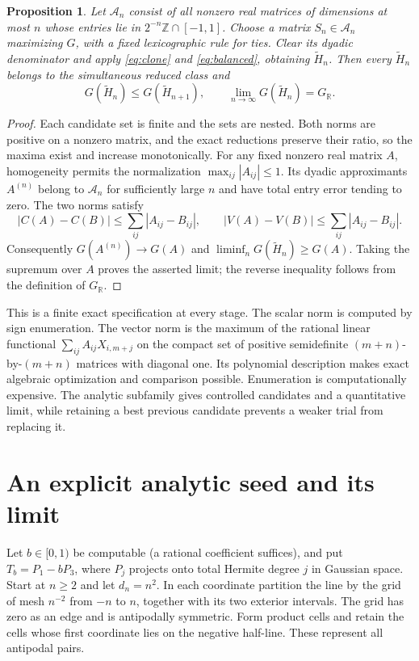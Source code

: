 \documentclass[11pt]{article}
\newtheorem{proposition}[theorem]{Proposition}
\begin{document}
\begin{proposition}\label{prop:universal-monotone}
Let $\mathcal A_n$ consist of all nonzero real matrices of dimensions
at most $n$ whose entries lie in
$2^{-n}\mathbb Z\cap[-1,1]$. Choose a matrix $S_n\in\mathcal A_n$
maximizing $G$, with a fixed lexicographic rule for ties. Clear its
dyadic denominator and apply \eqref{eq:clone} and \eqref{eq:balanced},
obtaining $\widetilde H_n$. Then every $\widetilde H_n$ belongs to the simultaneous reduced
class and
\[
 G(\widetilde H_n)\le G(\widetilde H_{n+1}),\qquad
 \lim_{n\to\infty}G(\widetilde H_n)=G_{\mathbb R}.
\]
\end{proposition}
\begin{proof}
Each candidate set is finite and the sets are nested. Both norms are
positive on a nonzero matrix, and the exact reductions preserve their
ratio, so the maxima exist and increase monotonically.
For any fixed nonzero real matrix $A$, homogeneity permits the
normalization $\max_{ij}|A_{ij}|\le1$. Its dyadic approximants $A^{(n)}$
belong to $\mathcal A_n$ for sufficiently large $n$ and have total
entry error tending to zero. The two norms satisfy
\[
 |C(A)-C(B)|\le\sum_{ij}|A_{ij}-B_{ij}|,
 \qquad |V(A)-V(B)|\le\sum_{ij}|A_{ij}-B_{ij}|.
\]
Consequently $G(A^{(n)})\to G(A)$ and
$\liminf_nG(\widetilde H_n)\ge G(A)$. Taking the supremum over $A$ proves the
asserted limit; the reverse inequality follows from the definition of
$G_{\mathbb R}$.
\end{proof}

This is a finite exact specification at every stage. The scalar norm is
computed by sign enumeration. The vector norm is the maximum of the
rational linear functional
$\sum_{ij}A_{ij}X_{i,m+j}$ on the compact set of positive semidefinite
$(m+n)$-by-$(m+n)$ matrices with diagonal one. Its polynomial
description makes exact algebraic optimization and comparison possible.
Enumeration is computationally expensive. The analytic subfamily gives
controlled candidates and a quantitative limit, while retaining a best
previous candidate prevents a weaker trial from replacing it.

\section{An explicit analytic seed and its limit}
Let $b\in[0,1)$ be computable (a rational coefficient suffices), and put
$T_b=P_1-bP_3$, where $P_j$ projects onto total
Hermite degree $j$ in Gaussian space. Start at $n\ge2$ and let $d_n=n^2$. In each coordinate
partition the line by the grid of mesh $n^{-2}$ from $-n$ to $n$, together
with its two exterior intervals. The grid has zero as an edge and is
antipodally symmetric. Form product cells and retain the cells whose
first coordinate lies on the negative half-line. These represent all
antipodal pairs.
\end{document}
